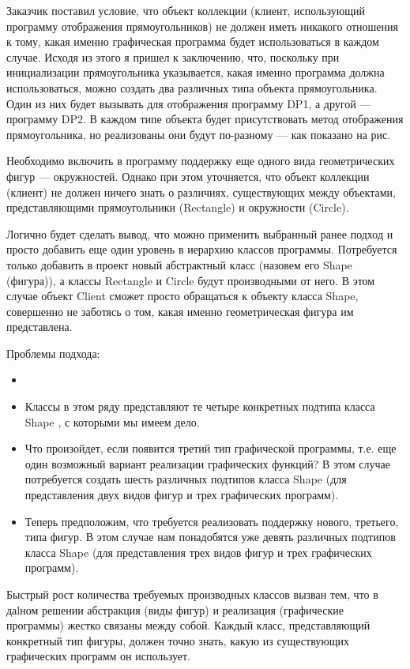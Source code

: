 \documentclass[10pt]{article}
\begin{document}
Заказчик поставил условие, что объект коллекции (клиент, использующий
программу отображения прямоугольников) не должен иметь никакого отношения к тому,
какая именно графическая программа будет использоваться в каждом случае. Исходя
из этого я пришел к заключению, что, поскольку при инициализации прямоугольника
указывается, какая именно программа должна использоваться, можно создать два
различных типа объекта прямоугольника. Один из них будет вызывать для отображения
программу DP1, а другой — программу DP2. В каждом типе объекта будет
присутствовать метод отображения прямоугольника, но реализованы они будут по-разному --- как
показано на рис.

Необходимо включить в программу поддержку еще одного вида геометрических фигур --- окружностей.
Однако при этом уточняется, что объект коллекции (клиент) не должен ничего знать о различиях,
существующих между объектами, представляющими прямоугольники (Rectangle) и окружности (Circle).

Логично будет сделать вывод, что можно применить выбранный ранее подход и
просто добавить еще один уровень в иерархию классов программы. Потребуется
только добавить в проект новый абстрактный класс (назовем его Shape (фигура)), а
классы Rectangle и Circle будут производными от него. В этом случае объект
Client сможет просто обращаться к объекту класса Shape, совершенно не заботясь о
том, какая именно геометрическая фигура им представлена.

Проблемы подхода:
\begin{itemize}
	\item
	\item Классы в этом ряду представляют те четыре конкретных подтипа класса Shape ,
	с которыми мы имеем дело.
	\item Что произойдет, если появится третий тип графической программы, т.е. еще
	один возможный вариант реализации графических функций? В этом случае
	потребуется создать шесть различных подтипов класса Shape
	(для представления двух видов фигур и трех графических программ).
	\item Теперь предположим, что требуется реализовать поддержку нового, третьего, типа
	фигур. В этом случае нам понадобятся уже девять различных подтипов класса Shape
	(для представления трех видов фигур и трех графических программ).
\end{itemize}

Быстрый рост количества требуемых производных классов вызван тем, что в даlном
решении абстракция (виды фигур) и реализация (графические программы) жестко связаны
между собой. Каждый класс, представляющий конкретный тип фигуры,
должен точно знать, какую из существующих графических программ он использует.
\end{document}
